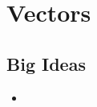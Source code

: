 \chapter{Vectors}
\label{chap:V}

\section{Big Ideas}
\label{sec:V Big Ideas}
\begin{itemize}
  \item 
\end{itemize}